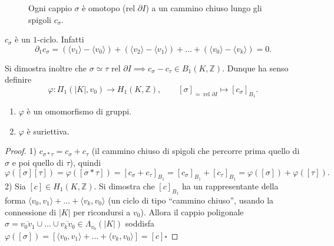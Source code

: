 \begin{figure}[H]
    \centering
    \caption{Ogni cappio $\sigma$ \`e omotopo (rel $\partial I$) a un cammino chiuso lungo gli spigoli $c_\sigma$.}
\end{figure}

\begin{observacion}
$c_\sigma$ \`e un $1$-ciclo. Infatti
\[
\partial_1 c_\sigma = (\langle v_1 \rangle - \langle v_0 \rangle) + (\langle v_2 \rangle - \langle v_1 \rangle) + \dots + (\langle v_0 \rangle - \langle v_k \rangle) = 0 .
\]
\end{observacion}

Si dimostra inoltre che $\sigma \simeq \tau$ rel $\partial I \implies c_\sigma - c_\tau \in B_1(K, \mathbb{Z})$. Dunque ha senso definire
\[
\varphi: \Pi_1(|K|, v_0) \longrightarrow H_1(K, \mathbb{Z}), \qquad [\sigma]_{\simeq \text{ rel } \partial I} \longmapsto [c_\sigma]_{B_1} .
\]

\begin{prop}
\begin{enumerate}
    \item $\varphi$ \`e un omomorfismo di gruppi.
    \item $\varphi$ \`e suriettiva.
\end{enumerate}
\end{prop}
\begin{proof}
1) $c_{\sigma * \tau} = c_\sigma + c_\tau$ (il cammino chiuso di spigoli che percorre prima quello di $\sigma$ e poi quello di $\tau$), quindi
\[
\varphi([\sigma][\tau]) = \varphi([\sigma * \tau]) = [c_\sigma + c_\tau]_{B_1} = [c_\sigma]_{B_1} + [c_\tau]_{B_1} = \varphi([\sigma]) + \varphi([\tau]).
\]
2) Sia $[c] \in H_1(K, \mathbb{Z})$. Si dimostra che $[c]_{B_1}$ ha un rappresentante della forma $\langle v_0, v_1 \rangle + \dots + \langle v_k, v_0 \rangle$ (un ciclo di tipo ``cammino chiuso'', usando la connessione di $|K|$ per ricondursi a $v_0$). Allora il cappio poligonale $\sigma = \overline{v_0 v_1} \cup \dots \cup \overline{v_k v_0} \in \Lambda_{v_0}(|K|)$ soddisfa $\varphi([\sigma]) = [\langle v_0, v_1 \rangle + \dots + \langle v_k, v_0 \rangle] = [c]$\hfill$\square$
\end{proof}

